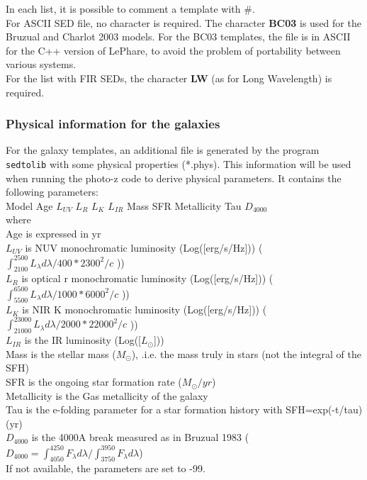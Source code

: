 \documentclass[12pt]{article}
\begin{document}
\noindent In each list, it is possible to comment a template with \#.    \\
 
\noindent For ASCII SED file, no character is required. The character %
{\bf BC03} is used for the Bruzual and Charlot 2003 models. For the BC03 templates, the file is in ASCII for the C++ version of LePhare, to avoid the problem of portability between various systems.   \\
  For the list with FIR SEDs,  the character {\bf LW} (as for Long Wavelength) is required.  
 
 
\subsubsection{Physical information for the galaxies }  

For the galaxy templates, an additional file is generated by the program {\texttt{sedtolib}} with some physical properties (*.phys). This information will be used when running the photo-z code to derive physical parameters. It contains the following parameters:  \\
   Model   Age    $L_{UV}$    $L_R$   $L_K$   $L_{IR}$   Mass   SFR   Metallicity   Tau    $D_{4000}$    \\
  where \\
Age is expressed in yr \\
$L_{UV}$ is NUV monochromatic luminosity (Log([erg/s/Hz])) ($\int_{2100}^{2500} L_{\lambda} d\lambda /400 * 2300^2/c$ )) \\
$L_R$ is optical r monochromatic luminosity (Log([erg/s/Hz])) ($\int_{5500}^{6500} L_{\lambda} d\lambda /1000 * 6000^2/c$ ))\\
$L_K$ is NIR    K monochromatic luminosity  (Log([erg/s/Hz])) ($\int_{21000}^{23000} L_{\lambda} d\lambda /2000 * 22000^2/c$ ))\\
$L_{IR}$ is the IR luminosity (Log([$L_{\odot}$])) \\
Mass is the stellar mass ($M_{\odot}$), .i.e. the mass truly in stars (not the integral of the SFH) \\
SFR is the ongoing star formation rate ($M_{\odot}/yr$) \\
Metallicity is  the Gas metallicity of the galaxy \\
Tau is the e-folding parameter for a star formation history with SFH=exp(-t/tau)   (yr) \\
$D_{4000}$ is the 4000A break measured as in Bruzual 1983 ($D_{4000}= \int_{4050}^{4250} F_{\lambda} d\lambda / \int_{3750}^{3950} F_{\lambda} d\lambda$) \\
If not available, the parameters are set to -99. \\
\end{document}
